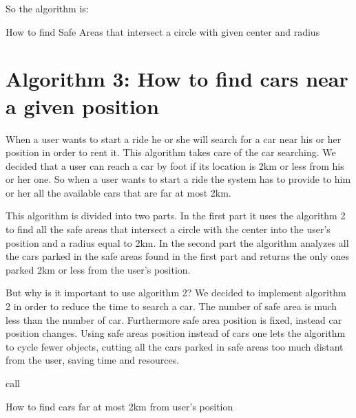 So the algorithm is:
\BlankLine
\begin{algorithm}[H]


	\BlankLine
{}
\Return \Res \;
\caption{How to find Safe Areas that intersect a circle with given center and radius}
\end{algorithm}

\section{Algorithm 3: How to find cars near a given position}
When a user wants to start a ride he or she will search for a car near his or her position in order to rent it. This algorithm takes care of the car searching.
We decided that a user can reach a car by foot if its location is 2km or less from his or her one. So when a user wants to start a ride the system has to provide to him or her all the available cars that are far at most 2km.

This algorithm is divided into two parts. In the first part it uses the algorithm 2 to find all the safe areas that intersect a circle with the center into the user's position and a radius equal to 2km. In the second part the algorithm analyzes all the cars parked in the safe areas found in the first part and returns the only ones parked 2km or less from the user's position.

But why is it important to use algorithm 2? We decided to implement algorithm 2 in order to reduce the time to search a car. The number of safe area is much less than the number of car. Furthermore safe area position is fixed, instead car position changes. Using safe areas position instead of cars one lets the algorithm to cycle fewer objects, cutting all the cars parked in safe areas too much distant from the user, saving time and resources.

\BlankLine
\begin{algorithm}[H]


	\BlankLine
	
call \;
\Return \Res \;
\caption{How to find cars far at most 2km from user's position}
\end{algorithm}


